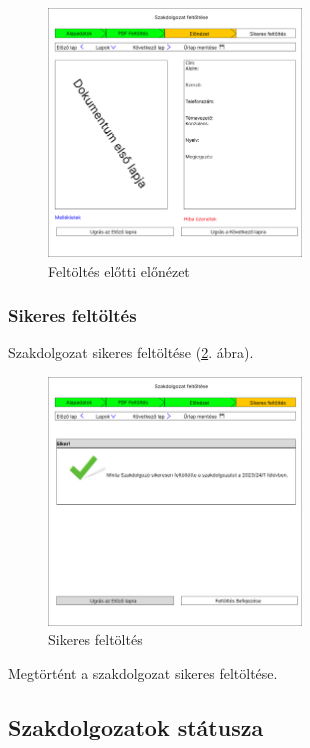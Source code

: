 \documentclass[a4paper,12pt]{article}
\begin{document}
\begin{figure}[h!]
	\centering
	\includegraphics[width=0.6\textwidth]{images/Web_pages/Preview.jpg}
	\caption{Feltöltés előtti előnézet}
	\label{fig:Preview}
\end{figure}

\subsubsection{Sikeres feltöltés}

Szakdolgozat sikeres feltöltése (\ref{fig:Completed}. ábra).

\begin{figure}[h!]
	\centering
	\includegraphics[width=0.6\textwidth]{images/Web_pages/Completed.jpg}
	\caption{Sikeres feltöltés}
	\label{fig:Completed}
\end{figure}

Megtörtént a szakdolgozat sikeres feltöltése.

\subsection{Szakdolgozatok státusza}
\end{document}
